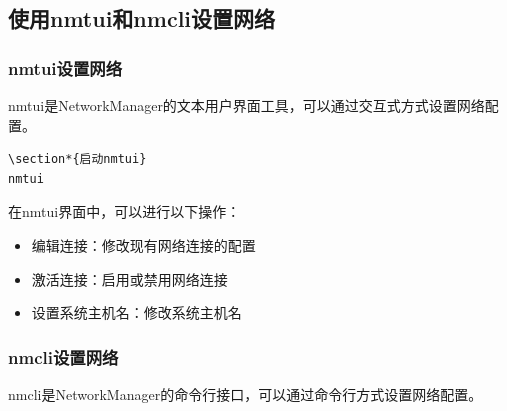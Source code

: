 \documentclass[12pt,UTF8]{ctexbook}
\begin{document}
\subsection{使用nmtui和nmcli设置网络}

\subsubsection{nmtui设置网络}
nmtui是NetworkManager的文本用户界面工具，可以通过交互式方式设置网络配置。

\begin{verbatim}
\section*{启动nmtui}
nmtui
\end{verbatim}

在nmtui界面中，可以进行以下操作：
\begin{itemize}
    \item 编辑连接：修改现有网络连接的配置
    \item 激活连接：启用或禁用网络连接
    \item 设置系统主机名：修改系统主机名
\end{itemize}

\subsubsection{nmcli设置网络}
nmcli是NetworkManager的命令行接口，可以通过命令行方式设置网络配置。
\end{document}
